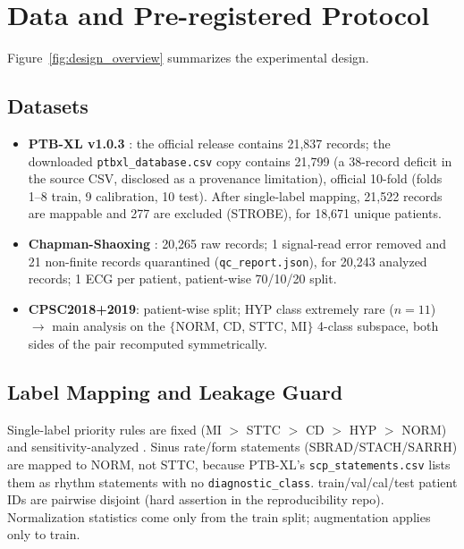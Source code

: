\documentclass[review,12pt,nonatbib]{elsarticle}
\begin{document}
\section{Data and Pre-registered Protocol}
\label{sec:data}
Figure~\ref{fig:design_overview} summarizes the experimental design.
\subsection{Datasets}
\begin{itemize}
    \item \textbf{PTB-XL v1.0.3} \cite{wagner2020ptbxl}: the official release contains 21,837
    records; the downloaded \texttt{ptbxl\_database.csv} copy contains 21,799
    (a 38-record deficit in the source CSV, disclosed as a provenance
    limitation), official 10-fold
    (folds 1--8 train, 9 calibration, 10 test). After
    single-label mapping, 21,522 records are mappable and 277 are
    excluded (STROBE), for 18,671 unique patients.
    \item \textbf{Chapman-Shaoxing} \cite{zheng2022ecgarrhythmia,goldberger2000}: 20,265
    raw records; 1 signal-read error removed and 21 non-finite records
    quarantined (\texttt{qc\_report.json}), for 20,243 analyzed records;
    1 ECG per patient, patient-wise 70/10/20 split.
    \item \textbf{CPSC2018+2019}: patient-wise split; HYP class extremely
    rare ($n=11$) $\rightarrow$ main analysis on the $\{$NORM, CD, STTC,
    MI$\}$ 4-class subspace, both sides of the pair recomputed
    symmetrically.
\end{itemize}
\subsection{Label Mapping and Leakage Guard}
Single-label priority rules are fixed (MI $>$ STTC $>$ CD $>$ HYP $>$ NORM)
and sensitivity-analyzed \cite{wagner2020ptbxl,reyna2022}. Sinus rate/form
statements (SBRAD/STACH/SARRH) are mapped to NORM, not STTC, because
PTB-XL's \texttt{scp\_statements.csv} lists them as rhythm statements
with no \texttt{diagnostic\_class}. train\slash val\slash cal\slash test patient IDs are
pairwise disjoint (hard assertion in the reproducibility repo).
Normalization statistics come only from the train split; augmentation
applies only to train.
\end{document}
